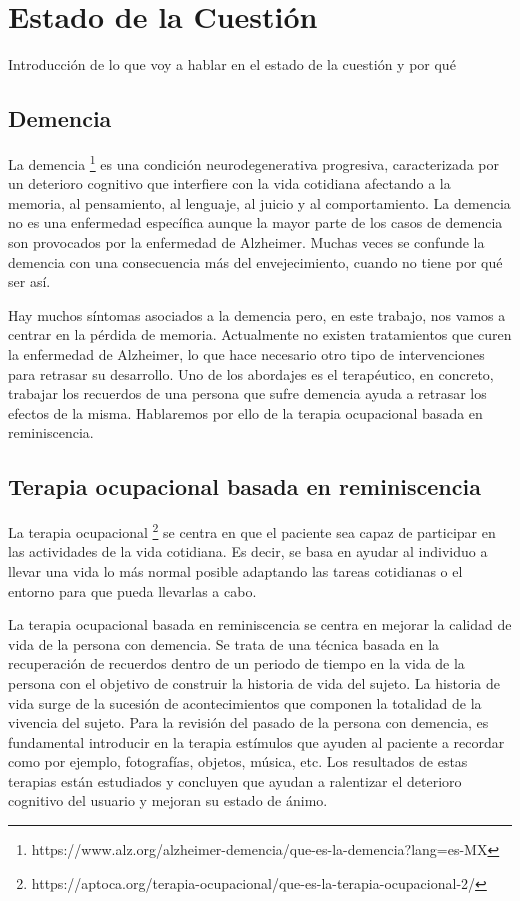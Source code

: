 \chapter{Estado de la Cuestión}
\label{cap:estadoDeLaCuestion}

Introducción de lo que voy a hablar en el estado de la cuestión y por qué


\section{Demencia}
La demencia \footnote{https://www.alz.org/alzheimer-demencia/que-es-la-demencia?lang=es-MX} es una condición neurodegenerativa progresiva, caracterizada por un deterioro cognitivo que interfiere con la vida cotidiana afectando a la memoria, al pensamiento, al lenguaje, al juicio y al comportamiento. La demencia no es una enfermedad específica aunque la mayor parte de los casos de demencia son provocados por la enfermedad de Alzheimer. Muchas veces se confunde la demencia con una consecuencia más del envejecimiento, cuando no tiene por qué ser así.

Hay muchos síntomas asociados a la demencia pero, en este trabajo, nos vamos a centrar en la pérdida de memoria. Actualmente no existen tratamientos que curen la enfermedad de Alzheimer, lo que hace necesario otro tipo de intervenciones para retrasar su desarrollo. Uno de los abordajes es el terapéutico, en concreto, trabajar los recuerdos de una persona que sufre demencia ayuda a retrasar los efectos de la misma. Hablaremos por ello de la terapia ocupacional basada en reminiscencia.

\section{Terapia ocupacional basada en reminiscencia}
La terapia ocupacional \footnote{https://aptoca.org/terapia-ocupacional/que-es-la-terapia-ocupacional-2/} se centra en que el paciente sea capaz de participar en las actividades de la vida cotidiana. Es decir, se basa en ayudar al individuo a llevar una vida lo más normal posible adaptando las tareas cotidianas o el entorno para que pueda llevarlas a cabo.

La terapia ocupacional basada en reminiscencia se centra en mejorar la calidad de vida de la persona con demencia. Se trata de una técnica basada en la recuperación de recuerdos dentro de un periodo de tiempo en la vida de la persona con el objetivo de construir la historia de vida del sujeto. La historia de vida surge de la sucesión de acontecimientos que componen la totalidad de la vivencia del sujeto. Para la revisión del pasado de la persona con demencia, es fundamental introducir en la terapia estímulos que ayuden al paciente a recordar como por ejemplo, fotografías, objetos, música, etc. Los resultados de estas terapias están estudiados y concluyen que ayudan a ralentizar el deterioro cognitivo del usuario y mejoran su estado de ánimo.


